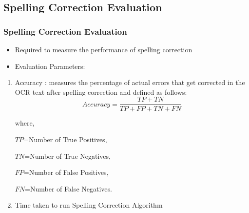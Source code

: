 \documentclass{beamer}
\begin{document}
\subsection{Spelling Correction Evaluation}

\begin{frame}
\frametitle{Spelling Correction Evaluation}

\begin{itemize}
 \justifying

\item
Required to measure the performance of spelling correction\\ \vspace{0.2in}
\item
Evaluation Parameters:
\end{itemize}
\begin{enumerate}
\item \alert{ Accuracy} : measures the percentage of actual errors that get corrected in the OCR text after spelling correction and defined as follows:
$$Accuracy=  \dfrac{TP+TN} {TP+ FP + TN + FN}$$


where, 

$TP$=Number of True Positives,

$TN$=Number of True Negatives,

 $FP$=Number of False Positives,

 $FN$=Number of False Negatives.



\item \alert{Time taken} to run Spelling Correction Algorithm
\end{enumerate}
\end{frame}
\end{document}
